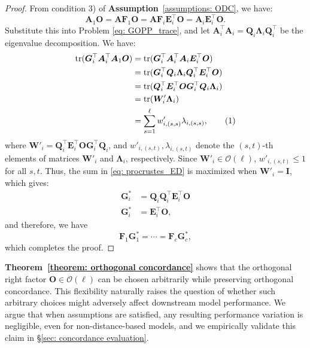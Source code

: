 \documentclass[final,3p,times]{elsarticle}
\theoremstyle{plain}
\newcommand{\matr}[1]{\bm{#1}}        %
\newcommand{\tr}{\operatorname{tr}}
\begin{document}
\begin{proof}
From condition 3) of \textbf{Assumption}~\ref{assumptions: ODC}, we have:
\begin{equation}
\matr{A}_1 \matr{O} = \matr{A} \matr{F}_1 \matr{O} = \matr{A} \matr{F}_i \matr{E}_{i}^\top \matr{O} = \matr{A}_i \matr{E}_{i}^\top \matr{O}.
\end{equation}
Substitute this into Problem \eqref{eq: GOPP_trace}, and let \(\matr{A}_i^\top \matr{A}_i = \matr{Q}_i \matr{\Lambda}_i \matr{Q}_i^\top\) be the eigenvalue decomposition. We have:
\begin{align*}
    \tr(\matr{G}_i^\top \matr{A}_i^\top \matr{A}_1 \matr{O}) &= \tr(\matr{G}_i^\top \matr{A}_i^\top \matr{A}_i \matr{E}_{i}^\top \matr{O} ) \\
                                             &= \tr(\matr{G}_i^\top \matr{Q}_i \matr{\Lambda}_i \matr{Q}_i^\top \matr{E}_{i}^\top \matr{O} ) \\
                                             &= \tr(\matr{Q}_i^\top \matr{E}_{i}^\top \matr{O} \matr{G}_i^\top \matr{Q}_i \matr{\Lambda}_i ) \\
                                             &= \tr(\matr{W}'_i \matr{\Lambda}_i) \\
                                             &= \sum_{s=1}^{\ell} w'_{i,(s,s)} \lambda_{i,(s,s)},
                                                 \stepcounter{equation}\tag{\theequation}\label{eq: procrustes_ED}
\end{align*}
where \(\matr{W}'_i = \matr{Q}_i^\top \matr{E}_{i}^\top \matr{O} \matr{G}_i^\top \matr{Q}_i\), and \(w'_{i,(s,t)}, \lambda_{i,(s,t)}\) denote the \((s,t)\)-th elements of matrices \(\matr{W}'_i\) and \(\matr{\Lambda}_i\), respectively. Since \(\matr{W}'_i \in \mathcal{O}(\ell)\), \(w'_{i,(s,t)} \leq 1\) for all \(s, t\). Thus, the sum in \eqref{eq: procrustes_ED} is maximized when \(\matr{W}'_i = \matr{I}\), which gives:
\begin{align*}
    \matr{G}_i^* &= \matr{Q}_i \matr{Q}_i^\top \matr{E}_{i}^\top \matr{O} \\
    \matr{G}_i^* &= \matr{E}_{i}^\top \matr{O},
\end{align*}
and therefore, we have
\begin{equation}
\matr{F}_1 \matr{G}_1^* = \cdots = \matr{F}_c \matr{G}_c^*,
\end{equation}
which completes the proof.
\end{proof}

\textbf{Theorem~\ref{theorem: orthogonal concordance}} shows that the orthogonal right factor $\matr{O} \in \mathcal{O}(\ell)$ can be chosen arbitrarily while preserving orthogonal concordance. This flexibility naturally raises the question of whether such arbitrary choices might adversely affect downstream model performance. We argue that when assumptions are satisfied, any resulting performance variation is negligible, even for non-distance-based models, and we empirically validate this claim in \S\ref{sec: concordance evaluation}.
\end{document}
